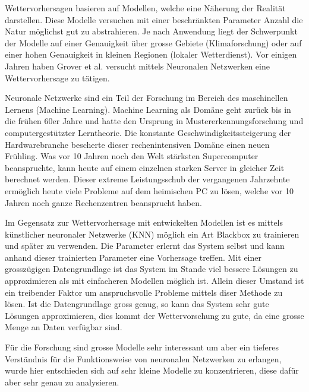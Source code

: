 Wettervorhersagen basieren auf Modellen, welche eine Näherung der Realität darstellen. Diese Modelle versuchen mit einer beschränkten Parameter Anzahl die Natur möglichst gut zu abstrahieren. Je nach Anwendung liegt der Schwerpunkt der Modelle auf einer Genauigkeit über grosse Gebiete (Klimaforschung) oder auf einer hohen Genauigkeit in kleinen Regionen (lokaler Wetterdienst). Vor einigen Jahren haben Grover et al. \cite{Groover:2015} versucht mittels Neuronalen Netzwerken eine Wettervorhersage zu tätigen.

Neuronale Netzwerke sind ein Teil der Forschung im Bereich des maschinellen Lernens (Machine Learning). Machine Learning als Domäne geht zurück bis in die frühen 60er Jahre und hatte den Ursprung in Mustererkennungsforschung und computergestützter Lerntheorie. Die konstante Geschwindigkeitssteigerung der Hardwarebranche bescherte dieser rechenintensiven Domäne einen neuen Frühling. Was vor 10 Jahren noch den Welt stärksten Supercomputer beanspruchte, kann heute auf einem einzelnen starken Server in gleicher Zeit berechnet werden. Dieser extreme Leistungsschub der vergangenen Jahrzehnte ermöglich heute viele Probleme auf dem heimischen PC zu lösen, welche vor 10 Jahren noch ganze Rechenzentren beansprucht haben.

Im Gegensatz zur Wettervorhersage mit entwickelten Modellen ist es mittels künstlicher neuronaler Netzwerke (KNN) möglich ein Art Blackbox zu trainieren und später zu verwenden. Die Parameter erlernt das System selbst und kann anhand dieser trainierten Parameter eine Vorhersage treffen. Mit einer grosszügigen Datengrundlage ist das System im Stande viel bessere Lösungen zu approximieren als mit einfacheren Modellen möglich ist. Allein dieser Umstand ist ein treibender Faktor um anspruchsvolle Probleme mittels diser Methode zu lösen. Ist die Datengrundlage gross genug, so kann das System sehr gute Lösungen approximieren, dies kommt der Wettervorschung zu gute, da eine grosse Menge an Daten verfügbar sind.

Für die Forschung sind grosse Modelle sehr interessant um aber ein tieferes Verständnis für die Funktionsweise von neuronalen Netzwerken zu erlangen, wurde hier entschieden sich auf sehr kleine Modelle zu konzentrieren, diese dafür aber sehr genau zu analysieren.

